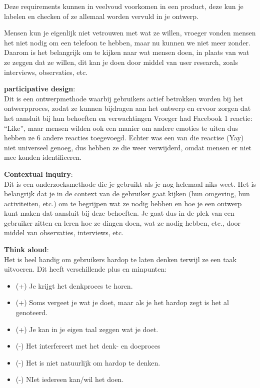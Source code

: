 \documentclass[nonacm, sigconf, balance=true]{acmart}
\begin{document}
    Deze requirements kunnen in veelvoud voorkomen in een product, deze kun je labelen en checken of ze allemaal worden vervuld in je ontwerp.

    Mensen kun je eigenlijk niet vetrouwen met wat ze willen, vroeger vonden mensen het niet nodig om een telefoon te hebben, maar nu kunnen we niet meer zonder.
    Daarom is het belangrijk om te kijken naar wat mensen doen, in plaats van wat ze zeggen dat ze willen, dit kan je doen door middel van user research, zoals interviews, observaties, etc.

    \newline

    \noindent\textbf{participative design}:\\
    \noindent Dit is een ontwerpmethode waarbij gebruikers actief betrokken worden bij het ontwerpproces, zodat ze kunnen bijdragen aan het ontwerp en ervoor zorgen dat het aansluit bij hun behoeften en verwachtingen
    Vroeger had Facebook 1 reactie: ``Like'', maar mensen wilden ook een manier om andere emoties te uiten dus hebben ze 6 andere reacties toegevoegd.
    Echter was een van die reactise (Yay) niet universeel genoeg, dus hebben ze die weer verwijderd, omdat mensen er niet mee konden identificeren.

    \noindent\textbf{Contextual inquiry}:\\
    \noindent Dit is een onderzoeksmethode die je gebruikt als je nog helemaal niks weet.
    Het is belangrijk dat je in de context van de gebruiker gaat kijken (hun omgeving, hun activiteiten, etc.) om te begrijpen wat ze nodig hebben en hoe je een ontwerp kunt maken dat aansluit bij deze behoeften.
    Je gaat dus in de plek van een gebruiker zitten en leren hoe ze dingen doen, wat ze nodig hebben, etc., door middel van observaties, interviews, etc.

    \noindent\textbf{Think aloud}:\\
    \noindent Het is heel handig om gebruikers hardop te laten denken terwijl ze een taak uitvoeren.
    Dit heeft verschillende plus en minpunten:
    \begin{itemize}
        \item (+) Je krijgt het denkproces te horen.
        \item (+) Soms vergeet je wat je doet, maar als je het hardop zegt is het al genoteerd.
        \item (+) Je kan in je eigen taal zeggen wat je doet.
        \item (-) Het interfereert met het denk- en doeproces
        \item (-) Het is niet natuurlijk om hardop te denken.
        \item (-) NIet iedereen kan/wil het doen.
    \end{itemize}
\end{document}

